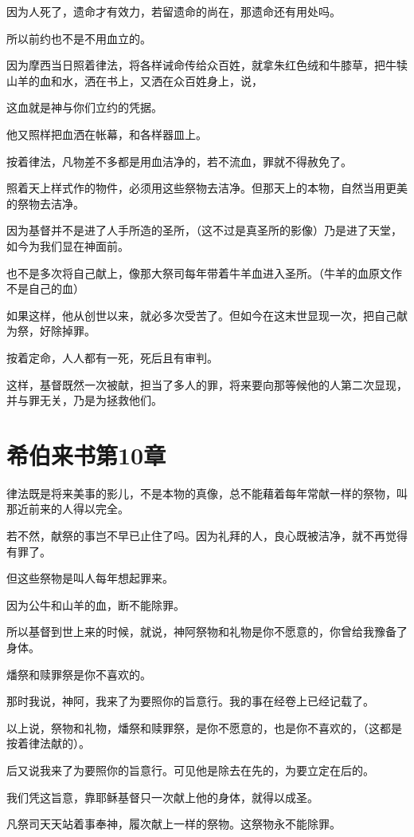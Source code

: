 \documentclass[12pt,oneside]{book}
\begin{document}
因为人死了，遗命才有效力，若留遗命的尚在，那遗命还有用处吗。

所以前约也不是不用血立的。

因为摩西当日照着律法，将各样诫命传给众百姓，就拿朱红色绒和牛膝草，把牛犊山羊的血和水，洒在书上，又洒在众百姓身上，说，

这血就是神与你们立约的凭据。

他又照样把血洒在帐幕，和各样器皿上。

按着律法，凡物差不多都是用血洁净的，若不流血，罪就不得赦免了。

照着天上样式作的物件，必须用这些祭物去洁净。但那天上的本物，自然当用更美的祭物去洁净。

因为基督并不是进了人手所造的圣所，（这不过是真圣所的影像）乃是进了天堂，如今为我们显在神面前。

也不是多次将自己献上，像那大祭司每年带着牛羊血进入圣所。（牛羊的血原文作不是自己的血）

如果这样，他从创世以来，就必多次受苦了。但如今在这末世显现一次，把自己献为祭，好除掉罪。

按着定命，人人都有一死，死后且有审判。

这样，基督既然一次被献，担当了多人的罪，将来要向那等候他的人第二次显现，并与罪无关，乃是为拯救他们。

\chapter{希伯来书第10章}
律法既是将来美事的影儿，不是本物的真像，总不能藉着每年常献一样的祭物，叫那近前来的人得以完全。

若不然，献祭的事岂不早已止住了吗。因为礼拜的人，良心既被洁净，就不再觉得有罪了。

但这些祭物是叫人每年想起罪来。

因为公牛和山羊的血，断不能除罪。

所以基督到世上来的时候，就说，神阿祭物和礼物是你不愿意的，你曾给我豫备了身体。

燔祭和赎罪祭是你不喜欢的。

那时我说，神阿，我来了为要照你的旨意行。我的事在经卷上已经记载了。

以上说，祭物和礼物，燔祭和赎罪祭，是你不愿意的，也是你不喜欢的，（这都是按着律法献的）。

后又说我来了为要照你的旨意行。可见他是除去在先的，为要立定在后的。

我们凭这旨意，靠耶稣基督只一次献上他的身体，就得以成圣。

凡祭司天天站着事奉神，履次献上一样的祭物。这祭物永不能除罪。
\end{document}
